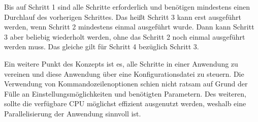 Bis auf Schritt 1 sind alle Schritte erforderlich und benötigen mindestens einen Durchlauf des vorherigen Schrittes. Das heißt Schritt 3 kann erst ausgeführt werden, wenn Schritt 2 mindestens einmal ausgeführt wurde. Dann kann Schritt 3 aber beliebig wiederholt werden, ohne das Schritt 2 noch einmal ausgeführt werden muss. Das gleiche gilt für Schritt 4 bezüglich Schritt 3.

Ein weitere Punkt des Konzepts ist es, alle Schritte in einer Anwendung zu vereinen und diese Anwendung über eine Konfigurationsdatei zu steuern. Die Verwendung von Kommandozeilenoptionen schien nicht ratsam auf Grund der Fülle an Einstellungsmöglichkeiten und benötigten Parametern. Des weiteren, sollte die verfügbare CPU möglichst effizient ausgenutzt werden, weshalb eine Parallelisierung der Anwendung sinnvoll ist.

